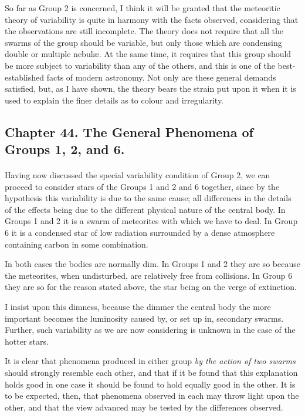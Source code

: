 \documentclass[a4paper, 12pt, oneside, polutonikogreek, english]{article}
\begin{document}
So far as Group 2 is concerned, I think it will be granted that the meteoritic theory of variability is quite in harmony with the facts observed, considering that the observations are still incomplete. The theory does not require that all the swarms of the group should be variable, but only those which are condensing double or multiple nebulæ. At the same time, it requires that this group should be more subject to variability than any of the others, and this is one of the best-established facts of modern astronomy. Not only are these general demands satisfied, but, as I have shown, the theory bears the strain put upon it when it is used to explain the finer details as to colour and irregularity.
\clearpage
\subsection{Chapter 44. The General Phenomena of Groups 1, 2, and 6.}
\paragraph{}
Having now discussed the special variability condition of Group 2, we can proceed to consider stars of the Groups 1 and 2 and 6 together, since by the hypothesis this variability is due to the same cause; all differences in the details of the effects being due to the different physical nature of the central body. In Groups 1 and 2 it is a swarm of meteorites with which we have to deal. In Group 6 it is a condensed star of low radiation surrounded by a dense atmosphere containing carbon in some combination.

In both cases the bodies are normally dim. In Groups 1 and 2 they are so because the meteorites, when undisturbed, are relatively free from collisions. In Group 6 they are so for the reason stated above, the star being on the verge of extinction.

I insist upon this dimness, because the dimmer the central body the more important becomes the luminosity caused by, or set up in, secondary swarms. Further, such variability as we are now considering is unknown in the case of the hotter stars.

It is clear that phenomena produced in either group \emph{by the action of two swarms} should strongly resemble each other, and that if it be found that this explanation holds good in one case it should be found to hold equally good in the other. It is to be expected, then, that phenomena observed in each may throw light upon the other, and that the view advanced may be tested by the differences observed.
\end{document}
